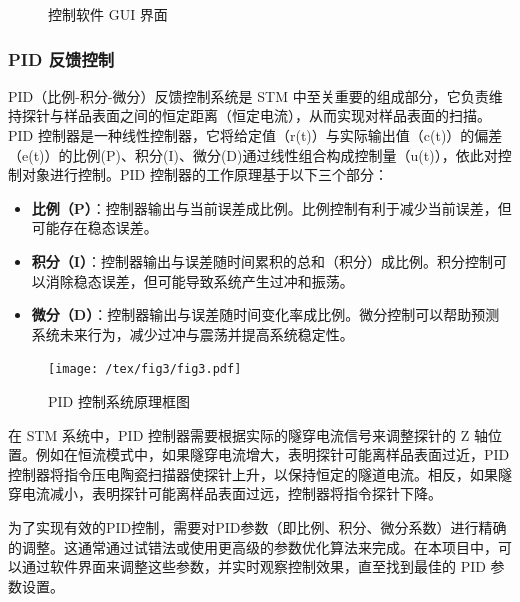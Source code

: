 \documentclass[zihao=-4]{ctexart}
\begin{document}
\begin{spacing}{1.5}
\begin{figure}[!h]
				\caption{控制软件 GUI 界面}
				\label{fig19}
			\end{figure}
			
			
			
		\subsubsection{PID 反馈控制}		
			PID（比例-积分-微分）反馈控制系统是 STM 中至关重要的组成部分，它负责维持探针与样品表面之间的恒定距离（恒定电流），从而实现对样品表面的扫描。PID 控制器是一种线性控制器，它将给定值（r(t)）与实际输出值（c(t)）的偏差（e(t)）的比例(P)、积分(I)、微分(D)通过线性组合构成控制量（u(t)），依此对控制对象进行控制\cite{ref20}。PID 控制器的工作原理基于以下三个部分：
			\begin{itemize}
				\item \textbf{比例（P）}：控制器输出与当前误差成比例。比例控制有利于减少当前误差，但可能存在稳态误差。
				
				\item \textbf{积分（I）}：控制器输出与误差随时间累积的总和（积分）成比例。积分控制可以消除稳态误差，但可能导致系统产生过冲和振荡。
				
				\item \textbf{微分（D）}：控制器输出与误差随时间变化率成比例。微分控制可以帮助预测系统未来行为，减少过冲与震荡并提高系统稳定性。
			\end{itemize}
			
			\begin{figure}[!h]
				\centering
				\texttt{[image: /tex/fig3/fig3.pdf]}
				\caption{PID 控制系统原理框图}
			\end{figure}
			
			
			在 STM 系统中，PID 控制器需要根据实际的隧穿电流信号来调整探针的 Z 轴位置。例如在恒流模式中，如果隧穿电流增大，表明探针可能离样品表面过近，PID 控制器将指令压电陶瓷扫描器使探针上升，以保持恒定的隧道电流。相反，如果隧穿电流减小，表明探针可能离样品表面过远，控制器将指令探针下降。
			
			为了实现有效的PID控制，需要对PID参数（即比例、积分、微分系数）进行精确的调整。这通常通过试错法或使用更高级的参数优化算法来完成。在本项目中，可以通过软件界面来调整这些参数，并实时观察控制效果，直至找到最佳的 PID 参数设置。
		

\end{spacing}
\end{document}
